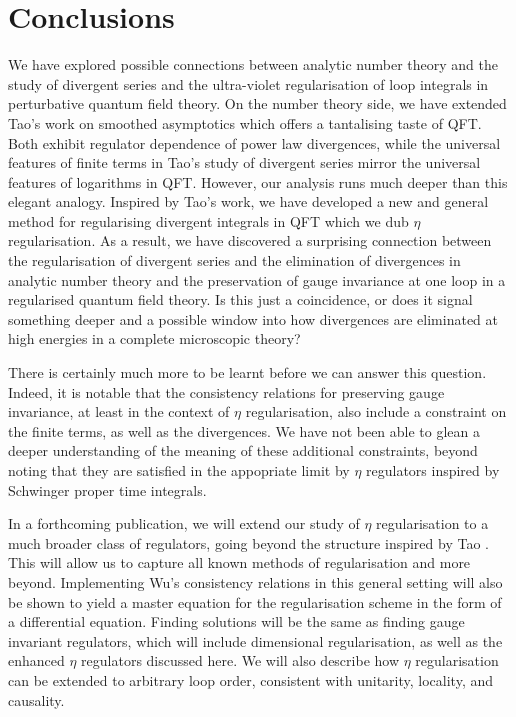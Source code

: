 \documentclass[12pt, letter]{article}
\begin{document}
\section{Conclusions} \label{sec:conc}

We have explored possible connections between analytic number theory and the study of divergent series and the ultra-violet regularisation of loop integrals in perturbative quantum field theory.  On the number theory side, we have extended Tao's work on smoothed asymptotics \cite{Tao11} which offers a tantalising taste of QFT. Both exhibit regulator dependence of power law divergences, while the universal features of finite terms in Tao's study of divergent series mirror the universal features of logarithms in QFT. However, our analysis runs much deeper than this elegant analogy.  Inspired by Tao's work, we have developed a new and general method for regularising divergent  integrals in QFT which we dub $\eta$ regularisation. As a result, we have discovered a surprising connection between the regularisation of divergent series and the elimination of divergences in analytic number theory and the preservation of gauge invariance at one loop in a regularised quantum field theory. Is this just a coincidence, or does it signal something deeper and a possible window into how divergences are eliminated at high energies in a complete microscopic theory?  

There is certainly much more to be learnt before we can answer this question. Indeed, it is notable that the consistency relations for preserving gauge invariance, at least in the context of $\eta$ regularisation, also include a constraint on the finite terms, as well as the divergences. We have not been able to glean a deeper understanding of the meaning of these additional constraints, beyond noting that they are satisfied in the appopriate limit by $\eta$ regulators inspired by Schwinger proper time integrals.

In a forthcoming publication, we will extend our study of $\eta$ regularisation to a much broader class of regulators,  going beyond the structure inspired by Tao \cite{PadillaSmith23}. This will allow us to capture all known methods  of regularisation and more beyond. Implementing Wu's consistency relations \cite{Wu03,Wu04,Wu14} in this general setting will also be shown to yield a master equation for the regularisation scheme in the form of a differential equation. Finding solutions will be the same as finding gauge invariant regulators, which will include dimensional regularisation, as well as the enhanced $\eta$ regulators discussed here. We will also describe how $\eta$ regularisation can be extended to arbitrary loop order, consistent with unitarity, locality, and causality.  
\end{document}
